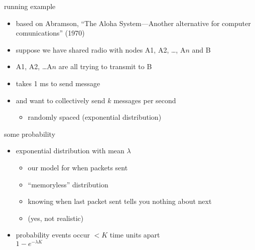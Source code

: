 \usetikzlibrary{arrows.meta}
\begin{frame}{running example}
\begin{itemize}
    \item based on Abramson, ``The Aloha System---Another alternative for computer comunications'' (1970)
    \vspace{.5cm}
    \item suppose we have shared radio with nodes A1, A2, \ldots, A$n$ and B
    \vspace{.5cm}
    \item A1, A2, \ldots A$n$ are all trying to transmit to B
    \item takes 1 ms to send message
    \item and want to collectively send $k$ messages per second
        \begin{itemize}
        \item randomly spaced (exponential distribution)
        \end{itemize}
\end{itemize}
\end{frame}

\begin{frame}{some probability}
    \begin{itemize}
    \item exponential distribution with mean $\lambda$
        \begin{itemize}
        \item our model for when packets sent
        \item ``memoryless'' distribution
        \item knowing when last packet sent tells you nothing about next
        \item (yes, not realistic)
        \end{itemize}
    \vspace{.5cm}
    \item probability events occur $< K$ time units apart \\
    $1-e^{-\lambda K}$
    \end{itemize}
\end{frame}


